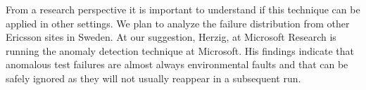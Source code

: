 From a research perspective it is important to understand if this technique can be applied in other settings. We plan to analyze the failure distribution from other Ericsson sites in Sweden. At our suggestion, Herzig, at Microsoft Research is running the anomaly detection technique at Microsoft. His findings indicate that anomalous test failures are almost always environmental faults and that can be safely ignored as they will not usually reappear in a subsequent run.


